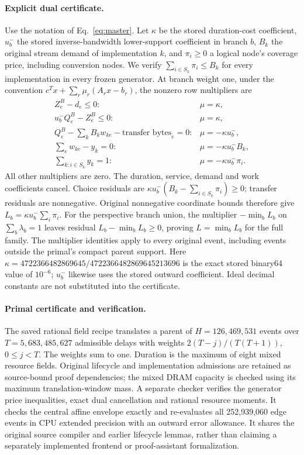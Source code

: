 \paragraph{Explicit dual certificate.}
Use the notation of Eq.~\eqref{eq:master}. Let $\kappa$ be the stored
duration-cost coefficient, $u_b^-$ the stored inverse-bandwidth lower-support
coefficient in branch $b$, $B_k$ the original stream demand of implementation
$k$, and $\pi_i\ge0$ a logical node's coverage price, including conversion nodes.
We verify $\sum_{i\in S_k}\pi_i\le B_k$ for every implementation in every
frozen generator. At branch weight one, under the convention
$c^Tx+\sum_r \mu_r(A_rx-b_r)$, the nonzero row multipliers are
\[
\begin{array}{ll}
 Z^B_e-d_e\le0: & \mu=\kappa,\\
 u_b^- Q^B_e-Z^B_e\le0: & \mu=\kappa,\\
 Q^B_e-\sum_k B_k w_{ke}-\text{transfer bytes}_e=0:
   & \mu=-\kappa u_b^-,\\
 \sum_e w_{ke}-y_k=0: & \mu=-\kappa u_b^- B_k,\\
 \sum_{k:i\in S_k}y_k=1: & \mu=-\kappa u_b^- \pi_i.
\end{array}
\]
All other multipliers are zero. The duration, service, demand and work
coefficients cancel. Choice residuals are
$\kappa u_b^-(B_k-\sum_{i\in S_k}\pi_i)\ge0$; transfer residuals are nonnegative.
Original nonnegative coordinate bounds therefore give
$L_b=\kappa u_b^-\sum_i\pi_i$. For the perspective branch union, the multiplier
$-\min_b L_b$ on $\sum_b\lambda_b=1$ leaves residual
$L_b-\min_b L_b\ge0$, proving $L=\min_bL_b$ for the full family.
The multiplier identities apply to every original event, including events
outside the primal's compact parent support.
Here $\kappa=4722366482869645/4722366482869645213696$ is the exact
stored binary64 value of $10^{-6}$; $u_b^-$ likewise uses the stored outward
coefficient. Ideal decimal constants are not substituted into the certificate.

\paragraph{Primal certificate and verification.}
The saved rational field recipe translates a parent of $H=126{,}469{,}531$
events over $T=5{,}683{,}485{,}627$ admissible delays with weights
$2(T-j)/(T(T+1))$, $0\le j<T$. The weights sum to one. Duration is the
maximum of eight mixed resource fields. Original lifecycle and implementation
admissions are retained as source-bound proof dependencies; the mixed DRAM
capacity is checked using its maximum translation-window mass.
A separate checker verifies the generator price inequalities, exact dual
cancellation and rational resource moments. It checks the central affine
envelope exactly and re-evaluates all 252,939,060 edge events in CPU extended
precision with an outward error allowance. It shares the original source
compiler and earlier lifecycle lemmas, rather than claiming a separately
implemented frontend or proof-assistant formalization.

